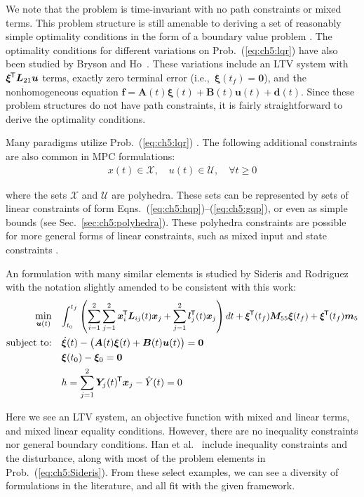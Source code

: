 \noindent We note that the problem is time-invariant with no path constraints or mixed terms.
This problem structure is still amenable to deriving a set of reasonably simple optimality conditions in the form of a boundary value problem \cite{Bryson1975a, Liberzon2012a}.
The optimality conditions for different variations on Prob.~(\ref{eq:ch5:lqr}) have also been studied by Bryson and Ho~\cite{Bryson1975a}. These variations include an LTV system with $\bm{\xi}^{\mkern-1.5mu\mathsf{T}} \bm{L}_{21} \bm{u}$ terms, exactly zero terminal error (i.e.,~$\bm{\xi}(t_f) = \bm{0}$), and the nonhomogeneous equation $\bm{f} = \bm{A}(t) \bm{\xi}(t) + \bm{B}(t) \bm{u}(t) + \bm{d}(t)$.
Since these problem structures do not have path constraints, it is fairly straightforward to derive the optimality conditions.

Many  paradigms utilize Prob.~(\ref{eq:ch5:lqr}) \cite{Borrelli2015a}. %
The following additional constraints are also common in MPC formulations:
\begin{align}
x(t) \in \mathcal{X}, \quad u(t) \in \mathcal{U}, \quad \forall t \geq 0
\end{align}

\noindent where the sets $\mathcal{X}$ and $\mathcal{U}$ are polyhedra.
These sets can be represented by sets of linear constraints of form Eqns.~(\ref{eq:ch5:hqp})--(\ref{eq:ch5:gqp}), or even as simple bounds (see Sec.~\ref{sec:ch5:polyhedra}).
These polyhedra constraints are possible for more general forms of linear constraints, such as mixed input and state constraints \cite{Borrelli2015a}.

An \lqdo{} formulation with many similar elements is studied by Sideris and Rodriguez~\cite{Sideris2010a} with the notation slightly amended to be consistent with this work:%
\begin{subequations}%
\label{eq:ch5:Sideris}
\begin{align}
\min_{\bm{u}(t)} \quad& \scalebox{0.94}{$\displaystyle  \int_{t_0}^{t_f} \left( \sum_{i=1}^2 \sum_{j=1}^2 \bm{x}_i\tran \bL_{ij}(t) \bm{x}_j + \sum_{j=1}^2 \bl_j\tran(t) \bm{x}_j \right) dt + \bm{\xi}\tran(t_f)\bm{M}_{55} \bm{\xi}(t_f) +  \bm{\xi}\tran(t_f)\bm{m}_5$} \\
\text{subject to:} \quad &  \hspace{0.0in} 
\dot{\bm{\xi}}(t) - \big(  \bm{A}(t) \bm{\xi}(t) + \bm{B}(t) \bm{u}(t) \big) = \bm{0} \\
& \bm{\xi}(t_0) - \bm{\xi}_0 = \bm{0} \\
& h = \sum_{j=1}^2 \bm{Y}_{j}(t)\tran \bm{x}_j - \hat{Y}(t) = 0
\end{align}
\end{subequations}%

\noindent Here we see an LTV system, an objective function with mixed and linear terms, and mixed linear equality conditions.
However, there are no inequality constraints nor general boundary conditions. 
Han et al.~\cite{Han2012a} include inequality constraints and the disturbance, along with most of the problem elements in Prob.~(\ref{eq:ch5:Sideris}).
From these select examples, we can see a diversity of formulations in the literature, and all fit with the given \lqdo{} framework.